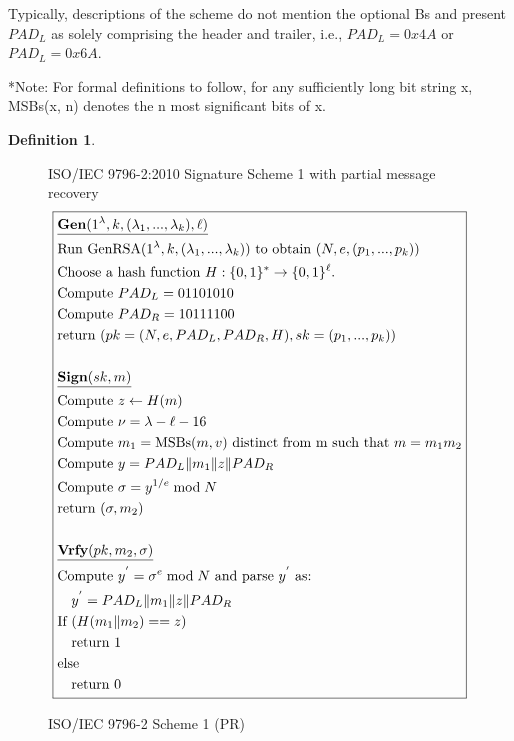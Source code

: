 \documentclass[]{final_report}
\theoremstyle{definition}
\newtheorem{definition}{Definition}[chapter]
\begin{document}
Typically, descriptions of the scheme do not mention the optional Bs and present $PAD_L$ as solely comprising the header and trailer, i.e., $PAD_L = 0x4A$ or $PAD_L = 0x6A$.

*Note: For formal definitions to follow, for any sufficiently long bit string x, MSBs(x, n) denotes the n most significant bits of x.

\begin{definition}
\begin{figure}[H]
\centering
\hfill ISO/IEC 9796-2:2010 Signature Scheme 1 with partial message recovery\hfill\phantom{} 
\[
\boxed{
\begin{aligned}
&\underline{\textbf{\text{Gen}} (1^\lambda, k, (\lambda_{1},...,\lambda_{k}), \ell)} \\
&\text{Run GenRSA}(1^\lambda, k, (\lambda_{1},...,\lambda_{k})) \text{ to obtain } (N, e, (p_{1},...,p_{k})) \\
&\text{Choose a hash function } H : \{0, 1\}^* \rightarrow \{0, 1\}^\ell. \\
&\text{Compute } PAD_{L} = 01101010 \\
&\text{Compute } PAD_{R} = 10111100 \\
&\text{return } (pk = (N, e, PAD_{L}, PAD_{R}, H), sk =  (p_{1},...,p_{k})) \\
\\
&\underline{\textbf{\text{Sign}} (sk, m)} \\
&\text{Compute } z \leftarrow H(m) \\
&\text{Compute } \nu = \lambda - \ell - 16 \\
&\text{Compute } m_{1} = \text{MSBs}(m, v) \text{ distinct from m such that } m = m_{1} m_{2} \\
&\text{Compute } y = PAD_{L} \| m_{1} \| z \| PAD_{R} \\
&\text{Compute } \sigma = y^{1/e} \bmod N \\
&\text{return } (\sigma, m_{2}) \\
\\
&\underline{\textbf{\text{Vrfy}} (pk, m_{2}, \sigma)} \\
&\text{Compute } y^{'} = \sigma^{e} \bmod N \text{ and parse } y^{'} \text{ as: } \\
&\quad y^{'} = PAD_{L} \| m_{1} \| z \| PAD_{R} \\
&\text{If } (H(m_{1} \| m_{2}) == z) \\
&\quad \text{return } 1 \\
&\text{else} \\
&\quad \text{return } 0 
\end{aligned}
}
\]
\caption{ISO/IEC 9796-2 Scheme 1 (PR)}
\label{fig:isoiec9796}
\end{figure}
\end{definition}
\end{document}
